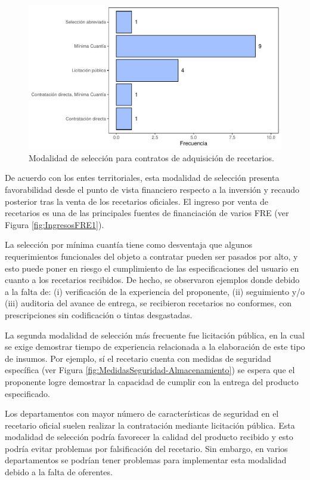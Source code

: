 \documentclass[
]{book}
\begin{document}
\begin{figure}

{\centering \includegraphics[width=0.85\linewidth]{InformeFinal_files/figure-latex/modalidadAdquisicion-1} 

}

\caption{Modalidad de selección para contratos de adquisición de recetarios.}\label{fig:modalidadAdquisicion}
\end{figure}

De acuerdo con los entes territoriales, esta modalidad de selección presenta favorabilidad desde el punto de vista financiero respecto a la inversión y recaudo posterior tras la venta de los recetarios oficiales. El ingreso por venta de recetarios es una de las principales fuentes de financiación de varios FRE (ver Figura \ref{fig:IngresosFRE1}).

La selección por mínima cuantía tiene como desventaja que algunos requerimientos funcionales del objeto a contratar pueden ser pasados por alto, y esto puede poner en riesgo el cumplimiento de las especificaciones del usuario en cuanto a los recetarios recibidos. De hecho, se observaron ejemplos donde debido a la falta de: (i) verificación de la experiencia del proponente, (ii) seguimiento y/o (iii) auditoria del avance de entrega, se recibieron recetarios no conformes, con prescripciones sin codificación o tintas desgastadas.

La segunda modalidad de selección más frecuente fue licitación pública, en la cual se exige demostrar tiempo de experiencia relacionada a la elaboración de este tipo de insumos. Por ejemplo, sí el recetario cuenta con medidas de seguridad específica (ver Figura \ref{fig:MedidasSeguridad-Almacenamiento}) se espera que el proponente logre demostrar la capacidad de cumplir con la entrega del producto especificado.

Los departamentos con mayor número de características de seguridad en el recetario oficial suelen realizar la contratación mediante licitación pública. Esta modalidad de selección podría favorecer la calidad del producto recibido y esto podría evitar problemas por falsificación del recetario. Sin embargo, en varios departamentos se podrían tener problemas para implementar esta modalidad debido a la falta de oferentes.
\end{document}
